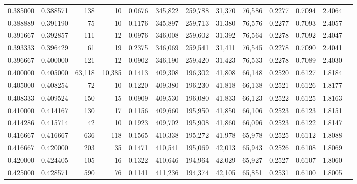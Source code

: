\begin{tabular}{rrrrrrrrrrrrr}
0.385000 & 0.388571 &    138 &     10 &                                     0.0676 & 345,822 & 259,788 &  31,370 &  76,586 & 0.2277 & 0.7094 & 2.4064 \\
0.388889 & 0.391190 &     75 &     10 &                                     0.1176 & 345,897 & 259,713 &  31,380 &  76,576 & 0.2277 & 0.7093 & 2.4057 \\
0.391667 & 0.392857 &    111 &     12 &                                     0.0976 & 346,008 & 259,602 &  31,392 &  76,564 & 0.2278 & 0.7092 & 2.4047 \\
0.393333 & 0.396429 &     61 &     19 &                                     0.2375 & 346,069 & 259,541 &  31,411 &  76,545 & 0.2278 & 0.7090 & 2.4041 \\
0.396667 & 0.400000 &    121 &     12 &                                     0.0902 & 346,190 & 259,420 &  31,423 &  76,533 & 0.2278 & 0.7089 & 2.4030 \\
0.400000 & 0.405000 & 63,118 & 10,385 &                                     0.1413 & 409,308 & 196,302 &  41,808 &  66,148 & 0.2520 & 0.6127 & 1.8184 \\
0.405000 & 0.408254 &     72 &     10 &                                     0.1220 & 409,380 & 196,230 &  41,818 &  66,138 & 0.2521 & 0.6126 & 1.8177 \\
0.408333 & 0.409524 &    150 &     15 &                                     0.0909 & 409,530 & 196,080 &  41,833 &  66,123 & 0.2522 & 0.6125 & 1.8163 \\
0.410000 & 0.414167 &    130 &     17 &                                     0.1156 & 409,660 & 195,950 &  41,850 &  66,106 & 0.2523 & 0.6123 & 1.8151 \\
0.414286 & 0.415714 &     42 &     10 &                                     0.1923 & 409,702 & 195,908 &  41,860 &  66,096 & 0.2523 & 0.6122 & 1.8147 \\
0.416667 & 0.416667 &    636 &    118 &                                     0.1565 & 410,338 & 195,272 &  41,978 &  65,978 & 0.2525 & 0.6112 & 1.8088 \\
0.416667 & 0.420000 &    203 &     35 &                                     0.1471 & 410,541 & 195,069 &  42,013 &  65,943 & 0.2526 & 0.6108 & 1.8069 \\
0.420000 & 0.424405 &    105 &     16 &                                     0.1322 & 410,646 & 194,964 &  42,029 &  65,927 & 0.2527 & 0.6107 & 1.8060 \\
0.425000 & 0.428571 &    590 &     76 &                                     0.1141 & 411,236 & 194,374 &  42,105 &  65,851 & 0.2531 & 0.6100 & 1.8005 \\

\end{tabular}
